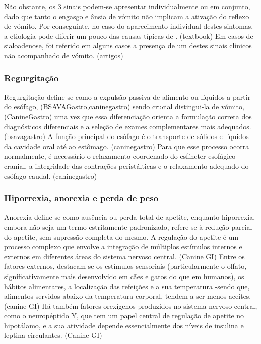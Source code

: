 Não obstante, os 3 sinais podem-se apresentar individualmente ou em conjunto, dado que tanto o engasgo e ânsia de vómito não implicam a ativação do reflexo de vómito. Por conseguinte, no caso do aparecimento individual destes sintomas, a etiologia pode diferir um pouco das causas típicas de \cite{Elwood2010}. (textbook) Em casos de sialoadenose, foi referido em alguns casos a presença de um destes sinais clínicos não acompanhado de vómito. (artigos)


\subsubsection{Regurgitação}

Regurgitação define-se como a expulsão passiva de alimento ou líquidos a partir do esófago, (BSAVAGastro,caninegastro) sendo crucial distingui-la de vómito, (CanineGastro) uma vez que essa diferenciação orienta a formulação correta dos diagnósticos diferenciais e a seleção de exames complementares mais adequados. (bsavagastro) 
A função principal do esófago é o transporte de sólidos e líquidos da cavidade oral até ao estômago. (caninegastro) Para que esse processo ocorra normalmente, é necessário o relaxamento coordenado do esfíncter esofágico cranial, a integridade das contrações peristálticas e o relaxamento adequado do esófago caudal. (caninegastro)


\subsubsection{Hiporrexia, anorexia e perda de peso}

Anorexia define-se como ausência ou perda total de apetite, enquanto hiporrexia, embora não seja um termo estritamente padronizado, refere-se à redução parcial do apetite, sem supressão completa do mesmo. \cite{Delaney2006}
A regulação do apetite é um processo complexo que envolve a integração de múltiplos estímulos internos e externos em diferentes áreas do sistema nervoso central. (Canine GI) Entre os fatores externos, destacam-se os estímulos sensoriais (particularmente o olfato, significativamente mais desenvolvido em cães e gatos do que em humanos), os hábitos alimentares, a localização das refeições e a sua temperatura -sendo que, alimentos servidos abaixo da temperatura corporal, tendem a ser menos aceites. (canine GI) 
Há também fatores orexígenos produzidos no sistema nervoso central, como o neuropéptido Y, que tem um papel central de regulação de apetite no hipotálamo, e a sua atividade depende essencialmente dos níveis de insulina e leptina circulantes. (Canine GI)


